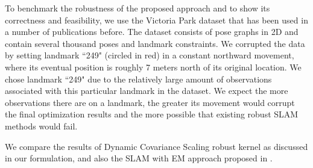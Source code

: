 To benchmark the robustness of the proposed approach and to show its
correctness and feasibility, we use the Victoria Park dataset that has been
used in a number of publications before. The dataset consists of pose graphs in
2D and contain several thousand poses and landmark constraints. We corrupted
the data by setting landmark ``249" (circled in red) in a constant northward
movement, where its eventual position is roughly 7 meters north of its original
location. We chose landmark ``249" due to the relatively large amount of
observations associated with this particular landmark in the dataset. We expect
the more observations there are on a landmark, the greater its movement would
corrupt the final optimization results and the more possible that existing
robust SLAM methods would fail.

We compare the results of Dynamic Covariance Scaling robust kernel as discussed in our
formulation, and also the SLAM with EM approach proposed in \cite{rogers2010slam}.

